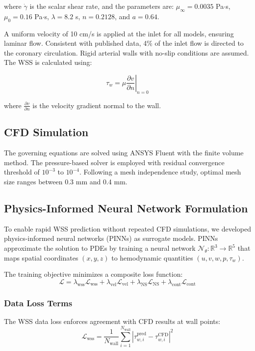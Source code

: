 \documentclass[12pt,a4paper]{article}
\begin{document}
\noindent where $\dot{\gamma}$ is the scalar shear rate, and the parameters are: $\mu_\infty = 0.0035$ Pa$\cdot$s, $\mu_0 = 0.16$ Pa$\cdot$s, $\lambda = 8.2$ s, $n = 0.2128$, and $a = 0.64$.

A uniform velocity of 10 cm/s is applied at the inlet for all models, ensuring laminar flow. Consistent with published data, 4\% of the inlet flow is directed to the coronary circulation. Rigid arterial walls with no-slip conditions are assumed. The WSS is calculated using:

\begin{equation}
    \tau_w = \mu \left. \frac{\partial v}{\partial n} \right|_{n=0}
    \label{eq:wss}
\end{equation}

\noindent where $\frac{\partial v}{\partial n}$ is the velocity gradient normal to the wall.

\subsection{CFD Simulation}

The governing equations are solved using ANSYS Fluent with the finite volume method. The pressure-based solver is employed with residual convergence threshold of $10^{-3}$ to $10^{-4}$. Following a mesh independence study, optimal mesh size ranges between 0.3 mm and 0.4 mm.

\subsection{Physics-Informed Neural Network Formulation}

To enable rapid WSS prediction without repeated CFD simulations, we developed physics-informed neural networks (PINNs) as surrogate models. PINNs approximate the solution to PDEs by training a neural network $\mathcal{N}_\theta: \mathbb{R}^3 \rightarrow \mathbb{R}^5$ that maps spatial coordinates $(x, y, z)$ to hemodynamic quantities $(u, v, w, p, \tau_w)$.

The training objective minimizes a composite loss function:
\begin{equation}
    \mathcal{L} = \lambda_{\text{wss}} \mathcal{L}_{\text{wss}} + \lambda_{\text{vel}} \mathcal{L}_{\text{vel}} + \lambda_{\text{NS}} \mathcal{L}_{\text{NS}} + \lambda_{\text{cont}} \mathcal{L}_{\text{cont}}
\end{equation}

\subsubsection{Data Loss Terms}
The WSS data loss enforces agreement with CFD results at wall points:
\begin{equation}
    \mathcal{L}_{\text{wss}} = \frac{1}{N_{\text{wall}}} \sum_{i=1}^{N_{\text{wall}}} |\tau_{w,i}^{\text{pred}} - \tau_{w,i}^{\text{CFD}}|^2
\end{equation}
\end{document}
